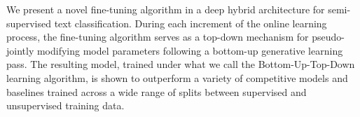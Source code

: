 We present a novel fine-tuning algorithm in a deep hybrid architecture for semi-supervised text classification.  During each increment of the online learning process, the fine-tuning algorithm serves as a top-down mechanism for pseudo-jointly modifying model parameters following a bottom-up generative learning pass. The resulting model, trained under what we call the Bottom-Up-Top-Down learning algorithm, is shown to outperform a variety of competitive models and baselines trained across a wide range of splits between supervised and unsupervised training data.
